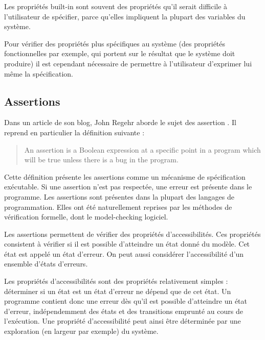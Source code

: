 Les propriétés built-in sont souvent des propriétés qu'il serait difficile à
l'utilisateur de spécifier, parce qu'elles impliquent la plupart des variables
du système.

Pour vérifier des propriétés plus spécifiques au système (des propriétés
fonctionnelles par exemple, qui portent sur le résultat que le système doit
produire) il est cependant nécessaire de permettre à l'utilisateur d'exprimer
lui même la spécification.

\subsection{Assertions}

Dans un article de son blog, John Regehr aborde le sujet des assertion
\cite{assertion_regehr}. Il reprend en particulier la définition suivante :

\begin{quotation}
An assertion is a Boolean expression at a specific point in a program which will
be true unless there is a bug in the program.
\hfill \cite{assertion_regehr}
\end{quotation}





Cette définition présente les assertions comme un mécanisme de spécification
exécutable. Si une assertion n'est pas respectée, une erreur est présente dans
le programme. Les assertions sont présentes dans la plupart des langages de
programmation. Elles ont été naturellement reprises par les méthodes de
vérification formelle, dont le model-checking logiciel.

Les assertions permettent de vérifier des propriétés d'accessibilités. Ces
propriétés consistent à vérifier si il est possible d'atteindre un état donné du
modèle. Cet état est appelé un état d'erreur. On peut aussi considérer
l'accessibilité d'un ensemble d'états d'erreurs.

Les propriétés d'accessibilités sont des propriétés relativement simples :
déterminer si un état est un état d'erreur ne dépend que de cet état. Un
programme contient donc une erreur dès qu'il est possible d'atteindre un état
d'erreur, indépendemment des états et des transitions emprunté au cours de
l'exécution. Une propriété d'accessibilité peut ainsi être déterminée par une
exploration (en largeur par exemple) du système.

